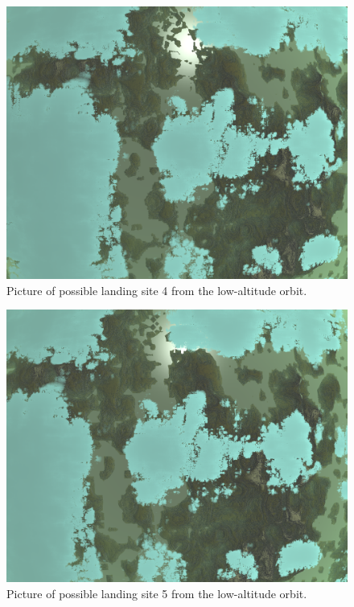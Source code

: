 \documentclass[reprint,english,notitlepage]{revtex4-2}
\begin{document}
    \begin{figure}[h]
        \centering
        \includegraphics[scale=0.14]{Figures/l_site4}
        \caption{Picture of possible landing site 4 from the low-altitude orbit.}\label{fig:l_site4}
    \end{figure}
    \begin{figure}[h]
        \centering
        \includegraphics[scale=0.14]{Figures/l_site5}
        \caption{Picture of possible landing site 5 from the low-altitude orbit.}\label{fig:l_site5}
    \end{figure}
\end{document}
